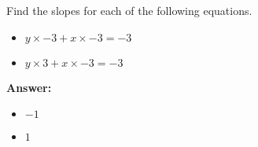  Find the slopes for each of the following equations. \begin{itemize}\item \( y \times -3 + x \times -3 = -3 \)\item \( y \times 3 + x \times -3 = -3 \)\end{itemize}

        \textbf{Answer:} \begin{itemize}\item \( -1 \)\item \( 1 \)\end{itemize}
